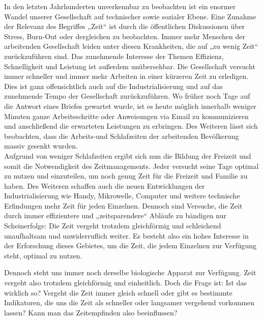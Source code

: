 \documentclass{Paper}
\begin{document}
In den letzten Jahrhunderten unverkennbar zu beobachten ist ein enormer Wandel unserer Gesellschaft auf technischer sowie sozialer Ebene.
Eine Zunahme der Relevanz des Begriffes „Zeit“ ist durch die öffentlichen Diskussionen über Stress, Burn-Out oder dergleichen zu beobachten.
Immer mehr Menschen der arbeitenden Gesellschaft leiden unter diesen Krankheiten, die auf „zu wenig Zeit“ zurückzuführen sind. Das zunehmende Interesse der Themen Effizienz, Schnelligkeit und Leistung ist außerdem unübersehbar. Die Gesellschaft versucht immer schneller und immer mehr Arbeiten in einer kürzeren Zeit zu erledigen. Dies ist ganz offensichtlich auch auf die Industrialisierung und auf das zunehmende Tempo der Gesellschaft zurückzuführen. \cite{Wallish2003} Wo früher noch Tage auf die Antwort eines Briefes gewartet wurde, ist es heute möglich innerhalb weniger Minuten ganze Arbeitsschritte oder Anweisungen via Email zu kommunizieren und anschließend die erwarteten Leistungen zu erbringen.
Des Weiteren lässt sich beobachten, dass die Arbeits-und Schlafzeiten der arbeitenden Bevölkerung massiv gesenkt wurden. \cite{DeutscheSozialgeschichte}
\\
Aufgrund von weniger Schlafzeiten ergibt sich nun die Bildung der Freizeit und somit die Notwendigkeit des Zeitmanagements. Jeder versucht seine Tage optimal zu nutzen und einzuteilen, um noch genug Zeit für die Freizeit und Familie zu haben. Des Weiteren schaffen auch die neuen Entwicklungen der Industrialisierung wie Handy, Mikrowelle, Computer und weitere technische Erfindungen mehr Zeit für jeden Einzelnen. Dennoch sind Versuche, die Zeit durch immer effizientere und „zeitsparendere“ Abläufe zu bändigen nur Scheinerfolge: Die Zeit vergeht trotzdem gleichförmig und schleichend unaufhaltsam und unwiderruflich weiter. \cite{Wallish2003} Es besteht also ein hohes Interesse in der Erforschung dieses Gebietes, um die Zeit, die jedem Einzelnen zur Verfügung steht, optimal zu nutzen.

Dennoch steht uns immer noch derselbe biologische Apparat zur Verfügung. Zeit vergeht also trotzdem gleichförmig und einheitlich. Doch die Frage ist: Ist das wirklich so? Vergeht die Zeit immer gleich schnell oder gibt es bestimmte Indikatoren, die uns die Zeit als schneller oder langsamer vergehend vorkommen lassen? Kann man das Zeitempfinden also beeinflussen?
\end{document}
